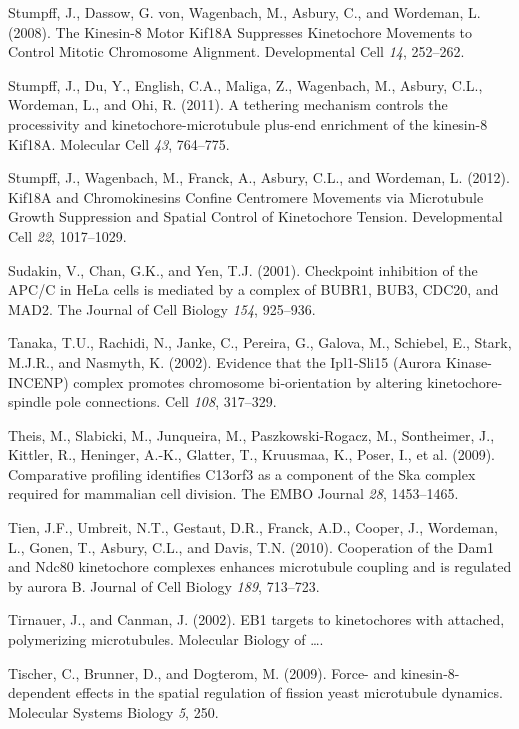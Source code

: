 \documentclass[12pt,a4paper,twoside,openright]{book}
\begin{document}
\hypertarget{ref-Stumpff2008}{}
Stumpff, J., Dassow, G. von, Wagenbach, M., Asbury, C., and Wordeman, L.
(2008). The Kinesin-8 Motor Kif18A Suppresses Kinetochore Movements to
Control Mitotic Chromosome Alignment. Developmental Cell \emph{14},
252--262.

\hypertarget{ref-Stumpff2011a}{}
Stumpff, J., Du, Y., English, C.A., Maliga, Z., Wagenbach, M., Asbury,
C.L., Wordeman, L., and Ohi, R. (2011). A tethering mechanism controls
the processivity and kinetochore-microtubule plus-end enrichment of the
kinesin-8 Kif18A. Molecular Cell \emph{43}, 764--775.

\hypertarget{ref-Stumpff2012}{}
Stumpff, J., Wagenbach, M., Franck, A., Asbury, C.L., and Wordeman, L.
(2012). Kif18A and Chromokinesins Confine Centromere Movements via
Microtubule Growth Suppression and Spatial Control of Kinetochore
Tension. Developmental Cell \emph{22}, 1017--1029.

\hypertarget{ref-Sudakin2001}{}
Sudakin, V., Chan, G.K., and Yen, T.J. (2001). Checkpoint inhibition of
the APC/C in HeLa cells is mediated by a complex of BUBR1, BUB3, CDC20,
and MAD2. The Journal of Cell Biology \emph{154}, 925--936.

\hypertarget{ref-Tanaka2002}{}
Tanaka, T.U., Rachidi, N., Janke, C., Pereira, G., Galova, M., Schiebel,
E., Stark, M.J.R., and Nasmyth, K. (2002). Evidence that the Ipl1-Sli15
(Aurora Kinase-INCENP) complex promotes chromosome bi-orientation by
altering kinetochore-spindle pole connections. Cell \emph{108},
317--329.

\hypertarget{ref-Theis2009}{}
Theis, M., Slabicki, M., Junqueira, M., Paszkowski-Rogacz, M.,
Sontheimer, J., Kittler, R., Heninger, A.-K., Glatter, T., Kruusmaa, K.,
Poser, I., et al. (2009). Comparative profiling identifies C13orf3 as a
component of the Ska complex required for mammalian cell division. The
EMBO Journal \emph{28}, 1453--1465.

\hypertarget{ref-Tien2010}{}
Tien, J.F., Umbreit, N.T., Gestaut, D.R., Franck, A.D., Cooper, J.,
Wordeman, L., Gonen, T., Asbury, C.L., and Davis, T.N. (2010).
Cooperation of the Dam1 and Ndc80 kinetochore complexes enhances
microtubule coupling and is regulated by aurora B. Journal of Cell
Biology \emph{189}, 713--723.

\hypertarget{ref-Tirnauer2002}{}
Tirnauer, J., and Canman, J. (2002). EB1 targets to kinetochores with
attached, polymerizing microtubules. Molecular Biology of \ldots{}.

\hypertarget{ref-Tischer2009}{}
Tischer, C., Brunner, D., and Dogterom, M. (2009). Force- and
kinesin-8-dependent effects in the spatial regulation of fission yeast
microtubule dynamics. Molecular Systems Biology \emph{5}, 250.
\end{document}
